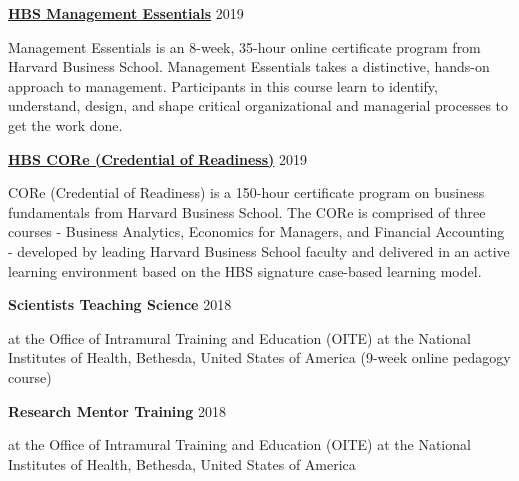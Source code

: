 \documentclass[margin,line]{res}
\begin{document}
\begin{resume}
\vspace*{-3mm}

{\bf \href{https://online.hbs.edu/courses/management-essentials/}{HBS Management Essentials}} \hfill {2019}\\
\vspace*{-3.5mm}
\begin{addmargin}[0pt]{.1\linewidth}
\vspace*{-1mm}
Management Essentials is an 8-week, 35-hour online certificate program from Harvard Business School. Management Essentials takes a distinctive, hands-on approach to management. Participants in this course learn to identify, understand, design, and shape critical organizational and managerial processes to get the work done.
\end{addmargin}

\vspace*{-3mm}

{\bf \href{https://online.hbs.edu/courses/core/}{HBS CORe (Credential of Readiness)}} \hfill {2019}\\
\vspace*{-3.5mm}
\begin{addmargin}[0pt]{.1\linewidth}
\vspace*{-1mm}
CORe (Credential of Readiness) is a 150-hour certificate program on business fundamentals from Harvard Business School. The CORe is comprised of three courses - Business Analytics, Economics for Managers, and Financial Accounting - developed by leading Harvard Business School faculty and delivered in an active learning environment based on the HBS signature case-based learning model.
\end{addmargin}

\vspace*{-3mm}

{\bf Scientists Teaching Science} \hfill {2018}\\
\vspace*{-3.5mm}
\begin{addmargin}[0pt]{.1\linewidth}
\vspace*{-1mm}
at the Office of Intramural Training and Education (OITE) at the National Institutes of Health, Bethesda, United States of America (9-week online pedagogy course)
\end{addmargin}

\vspace*{-3mm}

{\bf Research Mentor Training} \hfill {2018}\\
\vspace*{-3.5mm}
\begin{addmargin}[0pt]{.1\linewidth}
\vspace*{-1mm}
at the Office of Intramural Training and Education (OITE) at the National Institutes of Health, Bethesda, United States of America 
\end{addmargin}


\end{resume}
\end{document}
